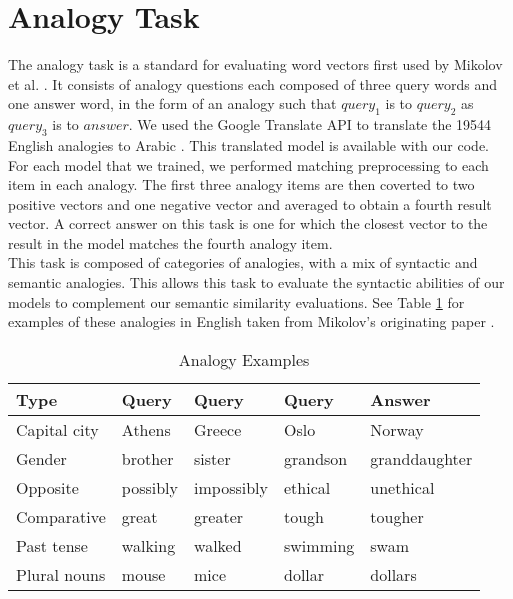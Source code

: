 \section{Analogy Task}

The analogy task is a standard for evaluating word vectors first used by Mikolov et al. \cite{mikoloveffic:2013}. It consists of analogy questions each composed of three query words and one answer word, in the form of an analogy such that $query_1$ is to $query_2$ as $query_3$ is to $answer$. We used the Google Translate API to translate the 19544 English analogies to Arabic \cite{google:online}. This translated model is available with our code. For each model that we trained, we performed matching preprocessing to each item in each analogy. The first three analogy items are then coverted to two positive vectors and one negative vector and averaged to obtain a fourth result vector. A correct answer on this task is one for which the closest vector to the result in the model matches the fourth analogy item.
\\
This task is composed of categories of analogies, with a mix of syntactic and semantic analogies. This allows this task to evaluate the syntactic abilities of our models to complement our semantic similarity evaluations. See Table \ref{table:analogyexamples} for examples of these analogies in English taken from Mikolov's originating paper \cite{mikoloveffic:2013}.

\begin{table}
\begin{center}

\begin{tabular}{l|l|l|l|l}
\textbf{Type} & \textbf{Query} & \textbf{Query} & \textbf{Query} & \textbf{Answer}\\
\hline
Capital city & Athens & Greece & Oslo & Norway \\
Gender & brother & sister & grandson & granddaughter \\
Opposite & possibly & impossibly & ethical & unethical \\
Comparative & great & greater &  tough & tougher \\
Past tense & walking & walked & swimming & swam \\
Plural nouns & mouse & mice & dollar & dollars \\
\end{tabular}
\caption{Analogy Examples}
\label{table:analogyexamples}
\end{center}
\end{table}



